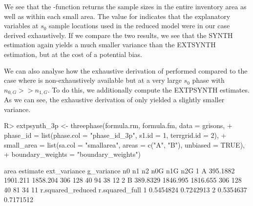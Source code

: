\documentclass[article]{jss}
\begin{document}
We see that the -function returns the sample sizes in the entire inventory area as well as within each small area. The value  for  indicates that the explanatory variables at $s_0$ sample locations used in the reduced model were in our case derived exhaustively. If we compare the two results, we see that the SYNTH estimation again yields a much smaller variance than the EXTSYNTH estimation, but at the cost of a potential bias.

We can also analyse how the exhaustive derivation of  performed compared to the case where  is non-exhaustively available but at a very large $s_0$ phase with $n_{0,G}>>n_{1,G}$. To do this, we additionally compute the EXTPSYNTH estimates. As we can see, the exhaustive derivation of  only yielded a slightly smaller variance.


\begin{Schunk}
\begin{Sinput}
R> extpsynth_3p <- threephase(formula.rm, formula.fm, data = grisons,
+    phase_id = list(phase.col = "phase_id_3p", s1.id = 1, terrgrid.id = 2),
+    small_area = list(sa.col = "smallarea", areas = c("A", "B"), unbiased = TRUE), 
+    boundary_weights = "boundary_weights")
\end{Sinput}
\end{Schunk}



\begin{Schunk}
\begin{Soutput}
  area estimate ext_variance g_variance  n0  n1 n2 n0G n1G n2G
1    A 395.1882     1901.211   1858.204 306 128 40  94  38  12
2    B 389.8329     1846.995   1816.655 306 128 40  81  34  11
  r.squared_reduced r.squared_full
1         0.5454824      0.7242913
2         0.5354637      0.7171512
\end{Soutput}
\end{Schunk}



\newpage




\end{document}
